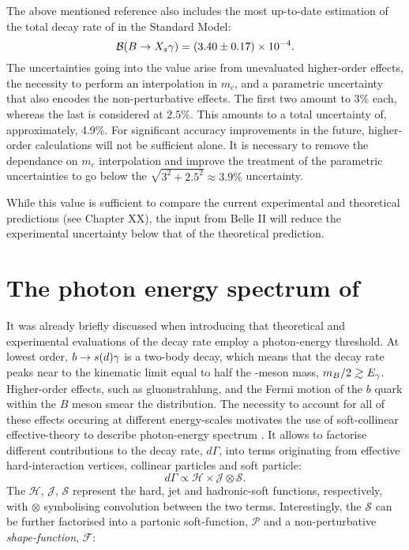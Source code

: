 The above mentioned reference also includes the most up-to-date estimation of the total decay rate of \BtoXsgamma in the Standard Model:
\begin{equation}
    \mathcal{B}({B\rightarrow X_{s} \gamma}) = (3.40\pm 0.17) \times 10^{-4}.
\end{equation}
The uncertainties going into the value arise from unevaluated higher-order effects, the necessity to perform an interpolation in $m_c$, and a parametric uncertainty that also encodes the non-perturbative effects.
The first two amount to $3\%$ each, whereas the last is considered at $2.5\%$. 
This amounts to a total uncertainty of, approximately, 4.9\%.
For significant accuracy improvements in the future, higher-order calculations will not be sufficient alone.
It is necessary to remove the dependance on $m_c$ interpolation and improve the treatment of the parametric uncertainties to go below the $\sqrt{3^2+2.5^2}\approx3.9\%$ uncertainty.

While this value is sufficient to compare the current experimental and theoretical predictions (see Chapter XX), the input from Belle II will reduce the experimental uncertainty below that of the theoretical prediction.

\section{The photon energy spectrum of \texorpdfstring{\BtoXsdgamma}{B->Xsg}}\label{eq:btosgamma_spectrum_theory}

It was already briefly discussed when introducing  that theoretical and experimental evaluations of the \BtoXsgamma decay rate employ a photon-energy threshold.
At lowest order, $b\rightarrow s(d) \gamma$ is a two-body decay, which means that the decay rate peaks near to the kinematic limit equal to half the \B-meson mass, $m_B/2\gsim E_{\g}$.
Higher-order effects, such as gluonstrahlung, and the Fermi motion of the $b$ quark within the $B$ meson smear the distribution.
The necessity to account for all of these effects occuring at different energy-scales motivates the use of soft-collinear effective-theory to describe \BtoXsgamma photon-energy spectrum \cite{Neubert:2004qw,Ligeti:2008ac}.
It allows to factorise different contributions to the decay rate, $d\Gamma$, into terms originating from effective hard-interaction vertices, collinear particles and soft particle:
\begin{equation}\label{eq:differential_decay_rate_SCET}
    d\Gamma \propto \mathcal{H} \times \mathcal{J} \otimes \mathcal{S}.
\end{equation}
The $\mathcal{H}$, $\mathcal{J}$, $\mathcal{S}$ represent the hard, jet and hadronic-soft functions, respectively, with $\otimes$ symbolising convolution between the two terms.
Interestingly, the $\mathcal{S}$ can be further factorised into a partonic soft-function, $\mathcal{P}$ and a non-perturbative \textit{shape-function}, $\mathcal{F}$:

